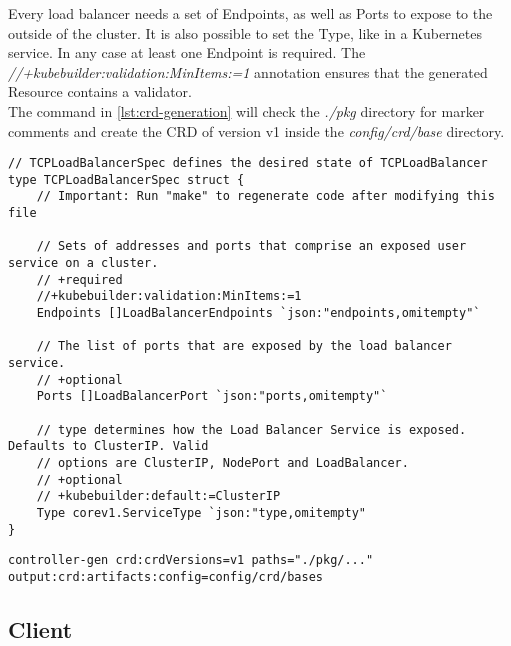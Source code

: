 Every load balancer needs a set of Endpoints, as well as Ports to expose to the outside of the cluster.
It is also possible to set the Type, like in a Kubernetes service.
In any case at least one Endpoint is required.
The \textit{//+kubebuilder:validation:MinItems:=1} annotation ensures that the generated Resource contains a validator.
\\
The command in \autoref{lst:crd-generation} will check the \textit{./pkg} directory for marker comments and create the CRD of version v1 inside the \textit{config/crd/base} directory.
\\
\begin{lstlisting}[caption={TCPLoadBalancerSpec struct}, label={lst:tcpbl-spec}]
// TCPLoadBalancerSpec defines the desired state of TCPLoadBalancer
type TCPLoadBalancerSpec struct {
	// Important: Run "make" to regenerate code after modifying this file

	// Sets of addresses and ports that comprise an exposed user service on a cluster.
	// +required
	//+kubebuilder:validation:MinItems:=1
	Endpoints []LoadBalancerEndpoints `json:"endpoints,omitempty"`

	// The list of ports that are exposed by the load balancer service.
	// +optional
	Ports []LoadBalancerPort `json:"ports,omitempty"`

	// type determines how the Load Balancer Service is exposed. Defaults to ClusterIP. Valid
	// options are ClusterIP, NodePort and LoadBalancer.
	// +optional
	// +kubebuilder:default:=ClusterIP
	Type corev1.ServiceType `json:"type,omitempty"
}
\end{lstlisting}

\begin{lstlisting}[numbers=none, caption={Generate CRD YAML files with controller-gen}, label={lst:crd-generation}]
	controller-gen crd:crdVersions=v1 paths="./pkg/..." output:crd:artifacts:config=config/crd/bases
\end{lstlisting}

\subsection{Client}\label{subsec:client}

